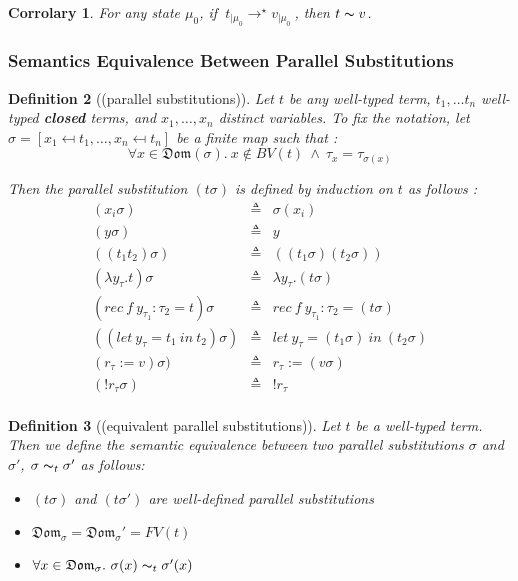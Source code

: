 \documentclass[a4paper,11pt,oneside]{article}
\theoremstyle{plain}
\newtheorem{definition}{Definition}[subsection]
\newtheorem{corr}[definition]{Corrolary}
\newcommand{\bwedge}{\boldsymbol{~\wedge~}}
\newcommand{\evalstar}[4]{~#1_{|\mu_#2} \rightarrow^{\star} #3_{|\mu_#4} ~}
\begin{document}
	\begin{corr} 
		For any state $\mu_0$, if $\evalstar{{t}}{0}{{v}}{0}$, then		
		$t \thicksim v$.
	\end{corr}
\subsubsection*{Semantics Equivalence Between Parallel Substitutions}

  



	\begin{definition}[(parallel substitutions)]
	Let $t$ be any well-typed term, $t_1, \dots t_n$ well-typed 
	\textit{\textbf{closed}} terms, and $x_1, \dots, x_n$ distinct variables.
	To fix the notation, 
	let $\sigma = [x_1 \mapsfrom t_1, \dots, x_n \mapsfrom t_n] $ be
	a finite map such that :  	
	$$\forall x\in\mathfrak{Dom}(\sigma).~x\notin BV(t)\bwedge\tau_x=
	\tau_{\sigma(x)}$$

	Then the parallel substitution $(t\sigma)$ is defined by induction on $t$ 
	as follows :
	\begin{displaymath}
	\begin{array}{lll}
	 (x_i\sigma)& \triangleq & \sigma(x_i)\\
	 (y\sigma)& \triangleq & y \\
	 ((t_1t_2)\sigma) & \triangleq & ((t_1\sigma)(t_2\sigma))\\
	 (\lambda y_{\tau}. t)\sigma & \triangleq & \lambda y_\tau. (t\sigma)\\
	 (rec~f~y_{\tau_1} : \tau_2 = t)\sigma & \triangleq 
	   & rec~f~y_{\tau_1} : \tau_2 = (t\sigma) \\
	 ((let~y_\tau = t_1~ in~ t_2)\sigma) & \triangleq 
	   & let~y_\tau = (t_1\sigma)~in~ (t_2\sigma)\\
	  (r_\tau := v)\sigma)	& \triangleq & r_\tau := (v\sigma) \\
	 (!r_\tau\sigma) & \triangleq & !r_\tau \\
	     	 
	\end{array}
	\end{displaymath}
	\label{}
	\end{definition}

	\begin{definition}[(equivalent parallel substitutions)]
	Let $t$ be a well-typed term. Then we define the semantic equivalence
	between two parallel substitutions $\sigma$ and $\sigma'$, 
	$\sigma \thicksim_t \sigma'$ as follows:
	\begin{itemize}
	\item[(1)] 
	  $(t\sigma)$ and $(t\sigma')$ are well-defined parallel substitutions
	\item[(2)]
	  $ \mathfrak{Dom}_\sigma = \mathfrak{Dom}_\sigma' = FV(t)$
	\item[(3)]
		$ \forall x \in \mathfrak{Dom}_\sigma.~ \sigma(x) \thicksim_t \sigma'(x)$
	\end{itemize}	 
	\label{equiv-subst-d}
	\end{definition}
\end{document}
